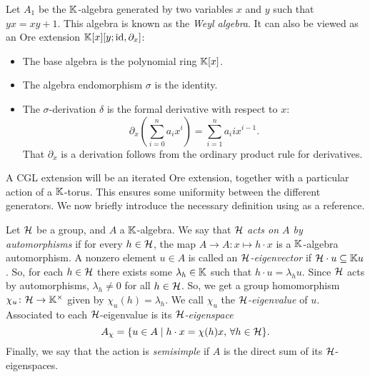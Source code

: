 \begin{example}
	Let $A_1$ be the $\mathbb{K}$-algebra generated by two variables $x$ and $y$ such that $yx =
		xy + 1$. This algebra is known as the \emph{Weyl algebra}. It can
	also be viewed as an Ore extension $\mathbb{K}[x][y; \operatorname{id}, \partial_x]$:
	\begin{itemize}
		\item The base algebra is the polynomial ring $\mathbb{K}[x]$.
		\item The algebra endomorphism $\sigma$ is the identity.
		\item The $\sigma$-derivation $\delta$ is the formal derivative with respect to $x$:
		      \begin{equation*}
			      \partial_x \left(\sum_{i=0}^n a_i x^i \right) = \sum_{i=1}^{n} a_i i x^{i-1}.
		      \end{equation*}
		      That $\partial_x$ is a derivation follows from the ordinary product rule for derivatives.
	\end{itemize}
\end{example}

A CGL extension will be an iterated Ore extension, together with a particular action of
a $\mathbb{K}$-torus. This ensures some uniformity between the different generators. We now
briefly introduce the necessary definition using \cite{GoodearlBrown2002LecturesAQC} as
a reference.

Let $\mathcal{H}$ be a group, and $A$ a $\mathbb{K}$-algebra. We say that $\mathcal{H}$ \emph{acts on $A$
	by automorphisms} if for every $h \in \mathcal{H}$, the map $A
	\to A \colon x \mapsto h \cdot x$ is a $\mathbb{K}$-algebra automorphism. A nonzero element
$u \in A$ is called an \emph{$\mathcal{H}$-eigenvector} if $\mathcal{H}
	\cdot u \subseteq \mathbb{K} u$. So, for each $h \in \mathcal{H}$ there exists some $\lambda_h \in
	\mathbb{K}$ such that $h \cdot u = \lambda_h u$. Since $\mathcal{H}$ acts by automorphisms,
$\lambda_h \neq 0$ for all $h \in \mathcal{H}$. So, we get a group homomorphism $\chi_u \colon
	\mathcal{H} \to \mathbb{K}^\times$ given by $\chi_u(h) = \lambda_h$. We call $\chi_u$ the
\emph{$\mathcal{H}$-eigenvalue} of $u$. Associated to each
$\mathcal{H}$-eigenvalue is its \emph{$\mathcal{H}$-eigenspace}
\begin{equation*}
	A_\chi = \{u \in A \mid h \cdot x = \chi(h)x,\, \forall h \in \mathcal{H} \}.
\end{equation*}
%
Finally, we say that the action is \emph{semisimple} if $A$ is
the direct sum of its $\mathcal{H}$-eigenspaces.

